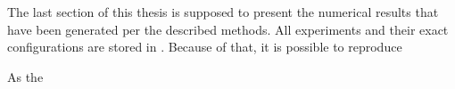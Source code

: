 The last section of this thesis is supposed to present the numerical results that have been generated per the described methods.
All experiments and their exact configurations are stored in 
.
Because of that, it is possible to reproduce  


As the %